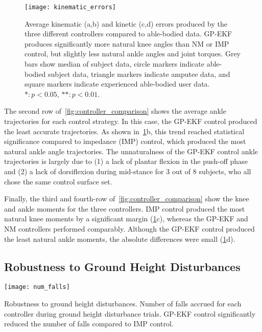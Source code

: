 \begin{figure}[t]
   \centering \texttt{[image: kinematic\_errors]}
   \caption[Average kinematic and kinetic errors]{Average kinematic (a,b) and
   kinetic (c,d) errors produced by the three different controllers compared to
   able-bodied data. GP-EKF produces significantly more natural knee angles than
   NM or IMP control, but slightly less natural ankle angles and joint torques.
   Grey bars show median of subject data, circle markers indicate able-bodied
   subject data, triangle markers indicate amputee data, and square markers
   indicate experienced able-bodied user data. $*: p < 0.05$, $**: p <
   0.01$.}\label{fig:kinematic_errors}
\end{figure}
The second row of~\cref{fig:controller_comparison} shows the average ankle
trajectories for each control strategy. In this case, the GP-EKF control
produced the least accurate trajectories. As shown
in~\cref{fig:kinematic_errors}b, this trend reached statistical significance
compared to impedance (IMP) control, which produced the most natural ankle angle
trajectories. The unnaturalness of the GP-EKF control ankle trajectories is
largely due to (1) a lack of plantar flexion in the push-off phase and (2) a
lack of dorsiflexion during mid-stance for 3 out of 8 subjects, who all chose
the same control surface set.

Finally, the third and fourth-row of~\cref{fig:controller_comparison} show the
knee and ankle moments for the three controllers. IMP control produced the most
natural knee moments by a significant margin (\cref{fig:kinematic_errors}c),
whereas the GP-EKF and NM controllers performed comparably. Although the GP-EKF
control produced the least natural ankle moments, the absolute differences were
small (\cref{fig:kinematic_errors}d).

\subsection{Robustness to Ground Height Disturbances}
\begin{marginfigure}
    \centering
    \texttt{[image: num\_falls]} 
    \caption[Robustness to ground height disturbances]{Robustness to ground
    height disturbances. Number of falls accrued for each controller during
    ground height disturbance trials. GP-EKF control significantly reduced the
    number of falls compared to IMP control.}\label{fig:num_block_falls}
\end{marginfigure}

